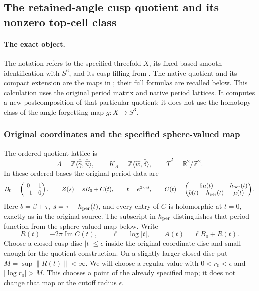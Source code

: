 \documentclass[11pt]{article}
\theoremstyle{definition}
\begin{document}
\subsection{The retained-angle cusp quotient and its nonzero top-cell class}
\label{ret:section}

\paragraph{The exact object.}
The notation refers to the specified threefold \(X\), its fixed based
smooth identification with \(S^6\), and its cusp filling from
\cite[\S\S3.7,4.1--4.5]{retbib:Canonical}.  The native quotient and its compact
extension are the maps in \cite{retbib:ConeRoutes}; their full formulas are
recalled below.  This calculation uses the original period matrix and
native period lattices.  It computes a new postcomposition of that
particular quotient; it does not use the homotopy class of the
angle-forgetting map \(g:X\to S^3\).

\subsubsection{Original coordinates and the specified sphere-valued map}

The ordered quotient lattice is
\[
 \overline\Lambda=\mathbb Z\langle\overline{\widehat\gamma},
              \overline{\widehat u}\rangle,
 \qquad
 K_\Lambda=\mathbb Z\langle\widehat w,\widehat\delta\rangle,
 \qquad
 \overline T^2=\mathbb R^2/\mathbb Z^2.
\]
In these ordered bases the original period data are
\begin{equation}
 B_0=\begin{pmatrix}0&1\\-1&0\end{pmatrix},\qquad
 Z(s)=sB_0+C(t),\qquad t=e^{2\pi i s},\qquad
 C(t)=\begin{pmatrix}6\mu(t)&h_{\rm per}(t)\\
 b(t)-h_{\rm per}(t)&\mu(t)\end{pmatrix}.
 \label{ret:eq:original-periods}
\end{equation}
Here \(b=\beta+\tau\), \(s=\tau-h_{\rm per}(t)\), and every entry of
\(C\) is holomorphic at \(t=0\), exactly as in the original source.
The subscript in \(h_{\rm per}\) distinguishes that period function
from the sphere-valued map below.  Write
\begin{equation}
 R(t)=-2\pi\operatorname{Im}C(t),\qquad
 \ell=\log|t|,\qquad A(t)=\ell B_0+R(t).
 \label{ret:eq:A}
\end{equation}
Choose a closed cusp disc \(|t|\leq\epsilon\) inside the original
coordinate disc and small enough for the quotient construction.  On a
slightly larger closed disc put \(M=\sup\|R(t)\|<\infty\).  We will
choose a regular value with \(0<r_0<\epsilon\) and
\(|\log r_0|>M\).  This chooses a point of the already specified map;
it does not change that map or the cutoff radius \(\epsilon\).
\end{document}
